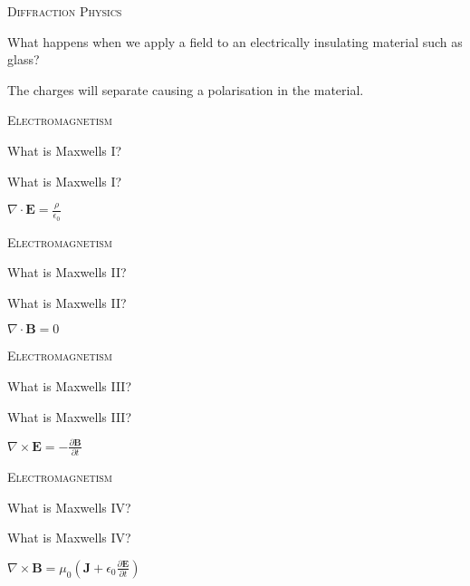 \documentclass{article}
\newenvironment{flashcard}[2][]
  {\noindent\textsc{\Large#1}\par\vfill
   {\centering\Large#2\par}
   \vfill
   \newpage\Large\centering
  }
  {\newpage}
\begin{document}


\begin{flashcard}[Diffraction Physics]{What happens when we apply a field to an electrically insulating material such as glass?}
The charges will separate causing a polarisation in the material.

\end{flashcard}



\begin{flashcard}[Electromagnetism]{What is Maxwells I?}
What is Maxwells I?

$\nabla \cdot \mathbf{E} = \frac {\rho} {\epsilon_0}$

\end{flashcard}



\begin{flashcard}[Electromagnetism]{What is Maxwells II?}
What is Maxwells II?

$\nabla \cdot \mathbf{B} = 0$

\end{flashcard}



\begin{flashcard}[Electromagnetism]{What is Maxwells III?}
What is Maxwells III?

$\nabla \times \mathbf{E} = -\frac{\partial \mathbf{B}} {\partial t}$

\end{flashcard}



\begin{flashcard}[Electromagnetism]{What is Maxwells IV?}
What is Maxwells IV?


$\nabla \times \mathbf{B} = \mu_0 \left( \mathbf{J} + \epsilon_0 \frac{\partial \mathbf{E}} {\partial t} \right)$

\end{flashcard}
\end{document}
